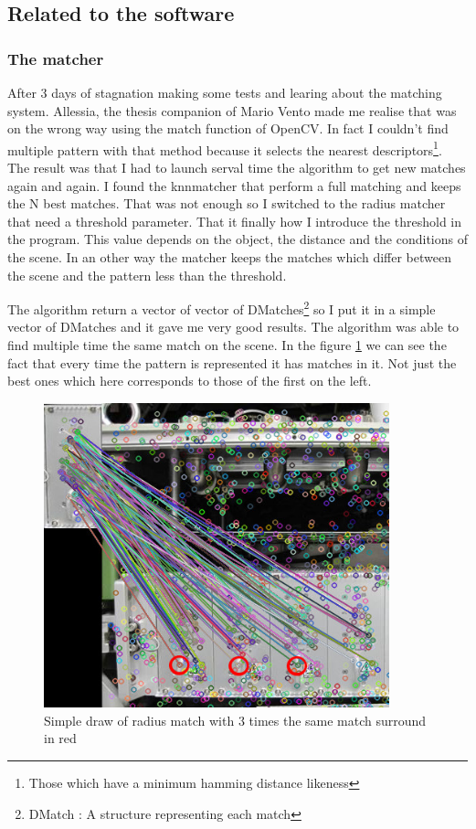 \documentclass[english,a4paper,11pt]{report}
\begin{document}
	\subsection{Related to the software}
	
	\subsubsection{The matcher}
	
	\par After 3 days of stagnation making some tests and learing about the matching system. Allessia, the thesis companion of Mario Vento made me realise that was on the wrong way using the match function of OpenCV. In fact I couldn't find multiple pattern with that method because it selects the nearest descriptors\footnote{Those which have a minimum hamming distance likeness}. The result was that I had to launch serval time the algorithm to get new matches again and again. I found the knnmatcher that perform a full matching and keeps the N best matches. That was not enough so I switched to the radius matcher that need a threshold parameter. That it finally how I introduce the threshold in the program. This value depends on the object, the distance and the conditions of the scene. In an other way the matcher keeps the matches which differ between the scene and the pattern less than the threshold.
	\par The algorithm return a vector of vector of DMatches\footnote{DMatch : A structure representing each match} so I put it in a simple vector of DMatches and it gave me very good results. The algorithm was able to find multiple time the same match on the scene. In the figure \ref{matches} we can see the fact that every time the pattern is represented it has matches in it. Not just the best ones which here corresponds to those of the first on the left.
	
	
	\begin{figure}[h]
		\begin{center}
			\includegraphics[width=10cm]{images_not_compressed/matches.jpg}
			\caption{Simple draw of radius match with 3 times the same match surround in red}
			\label{matches}	
		\end{center}
	\end{figure}
	
\end{document}
